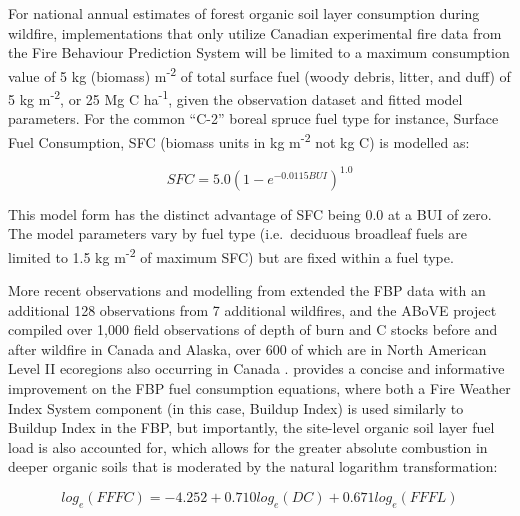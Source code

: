 \documentclass[, manuscript]{copernicus}
\begin{document}
For national annual estimates of forest organic soil layer consumption
during wildfire, implementations that only utilize Canadian experimental
fire data from the Fire Behaviour Prediction System will be limited to a
maximum consumption value of 5 kg (biomass) m\textsuperscript{-2} of
total surface fuel (woody debris, litter, and duff) of 5 kg
m\textsuperscript{-2}, or 25 Mg C ha\textsuperscript{-1}, given the
observation dataset and fitted model parameters. For the common ``C-2''
boreal spruce fuel type for instance, Surface Fuel Consumption, SFC
(biomass units in kg m\textsuperscript{-2} not kg C) is modelled as:

\begin{equation}
SFC = 5.0 \left(1-e^{-0.0115BUI} \right)^{1.0}
\end{equation}

This model form has the distinct advantage of SFC being 0.0 at a BUI of
zero. The model parameters vary by fuel type (i.e.~deciduous broadleaf
fuels are limited to 1.5 kg m\textsuperscript{-2} of maximum SFC) but
are fixed within a fuel type.

More recent observations and modelling from \citet{degroot2009} extended
the FBP data with an additional 128 observations from 7 additional
wildfires, and the ABoVE project compiled over 1,000 field observations
of depth of burn and C stocks before and after wildfire in Canada and
Alaska, over 600 of which are in North American Level II ecoregions also
occurring in Canada \citep{walker2020}. \citet{degroot2009} provides a
concise and informative improvement on the FBP fuel consumption
equations, where both a Fire Weather Index System component (in this
case, Buildup Index) is used similarly to Buildup Index in the FBP, but
importantly, the site-level organic soil layer fuel load is also
accounted for, which allows for the greater absolute combustion in
deeper organic soils that is moderated by the natural logarithm
transformation:

\begin{equation}
log_{e}(FFFC) = -4.252+0.710log_{e}(DC) + 0.671log_{e}(FFFL)
\end{equation}
\end{document}
